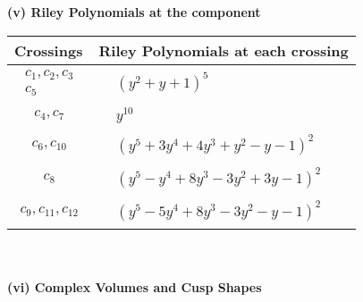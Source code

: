 \documentclass[1p]{elsarticle_modified}
\theoremstyle{definition}
\begin{document}
\newpage\renewcommand{\arraystretch}{1}
\flushleft \textbf{(v) Riley Polynomials at the component}\newline \\
\begin{tabular}{m{50pt}|m{274pt}}
Crossings & \hspace{64pt}Riley Polynomials at each crossing \\
\hline $$\begin{aligned}c_{1},c_{2},c_{3}\\c_{5}\end{aligned}$$&$\begin{aligned}
&(y^2+y+1)^5
\end{aligned}$\\
\hline $$\begin{aligned}c_{4},c_{7}\end{aligned}$$&$\begin{aligned}
&y^{10}
\end{aligned}$\\
\hline $$\begin{aligned}c_{6},c_{10}\end{aligned}$$&$\begin{aligned}
&(y^5+3 y^4+4 y^3+y^2- y-1)^2
\end{aligned}$\\
\hline $$\begin{aligned}c_{8}\end{aligned}$$&$\begin{aligned}
&(y^5- y^4+8 y^3-3 y^2+3 y-1)^2
\end{aligned}$\\
\hline $$\begin{aligned}c_{9},c_{11},c_{12}\end{aligned}$$&$\begin{aligned}
&(y^5-5 y^4+8 y^3-3 y^2- y-1)^2
\end{aligned}$\\
\hline
\end{tabular}\\~\\
\newpage\flushleft \textbf{(vi) Complex Volumes and Cusp Shapes}
\end{document}

